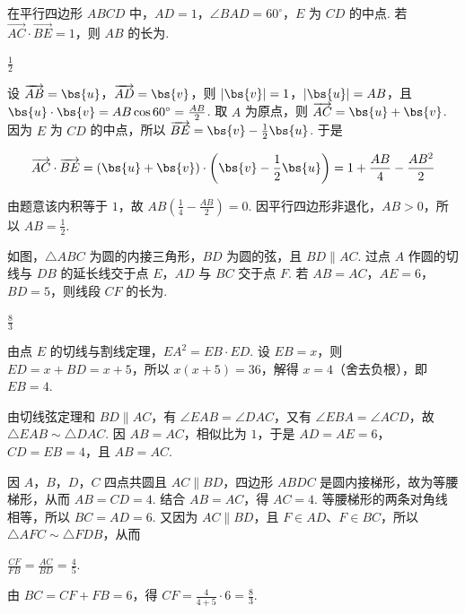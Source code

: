 \begin{problem}
在平行四边形 \(ABCD\) 中，\(AD = 1\)，\(\angle BAD = 60^{\circ}\)，\(E\) 为 \(CD\) 的中点. 若 \(\overrightarrow{AC} \cdot \overrightarrow{BE} = 1\)，则 \(AB\) 的长为\fillinblank{}.
\end{problem}

\begin{answer}
\(\frac{1}{2}\)
\end{answer}

\begin{solution}
设 \(\overrightarrow{AB}=\bs{u}\)，\(\overrightarrow{AD}=\bs{v}\)，则 \(|\bs{v}|=1\)，\(|\bs{u}|=AB\)，且 \(\bs{u}\cdot\bs{v}=AB\cos60^\circ=\frac{AB}{2}\). 取 \(A\) 为原点，则 \(\overrightarrow{AC}=\bs{u}+\bs{v}\). 因为 \(E\) 为 \(CD\) 的中点，所以 \(\overrightarrow{BE}=\bs{v}-\frac{1}{2}\bs{u}\). 于是

\[
\overrightarrow{AC}\cdot\overrightarrow{BE}
=(\bs{u}+\bs{v})\cdot\left(\bs{v}-\frac{1}{2}\bs{u}\right)
=1+\frac{AB}{4}-\frac{AB^2}{2}
\]

由题意该内积等于 \(1\)，故 \(AB\left(\frac{1}{4}-\frac{AB}{2}\right)=0\). 因平行四边形非退化，\(AB>0\)，所以 \(AB=\frac{1}{2}\).
\end{solution}

\begin{problem}
如图，\(\triangle ABC\) 为圆的内接三角形，\(BD\) 为圆的弦，且 \(BD \parallel AC\). 过点 \(A\) 作圆的切线与 \(DB\) 的延长线交于点 \(E\)，\(AD\) 与 \(BC\) 交于点 \(F\). 若 \(AB = AC\)，\(AE = 6\)，\(BD = 5\)，则线段 \(CF\) 的长为\fillinblank{}.
\end{problem}

\begin{answer}
\(\frac{8}{3}\)
\end{answer}

\begin{solution}
由点 \(E\) 的切线与割线定理，\(EA^2=EB\cdot ED\). 设 \(EB=x\)，则 \(ED=x+BD=x+5\)，所以 \(x(x+5)=36\)，解得 \(x=4\)（舍去负根），即 \(EB=4\).

由切线弦定理和 \(BD\parallel AC\)，有 \(\angle EAB=\angle DAC\)，又有 \(\angle EBA=\angle ACD\)，故 \(\triangle EAB\sim\triangle DAC\). 因 \(AB=AC\)，相似比为 \(1\)，于是 \(AD=AE=6\)，\(CD=EB=4\)，且 \(AB=AC\).

因 \(A\)，\(B\)，\(D\)，\(C\) 四点共圆且 \(AC\parallel BD\)，四边形 \(ABDC\) 是圆内接梯形，故为等腰梯形，从而 \(AB=CD=4\). 结合 \(AB=AC\)，得 \(AC=4\). 等腰梯形的两条对角线相等，所以 \(BC=AD=6\). 又因为 \(AC\parallel BD\)，且 \(F\in AD\)、\(F\in BC\)，所以 \(\triangle AFC\sim\triangle FDB\)，从而

\(\frac{CF}{FB}=\frac{AC}{BD}=\frac{4}{5}\).

由 \(BC=CF+FB=6\)，得 \(CF=\frac{4}{4+5}\cdot6=\frac{8}{3}\).
\end{solution}

